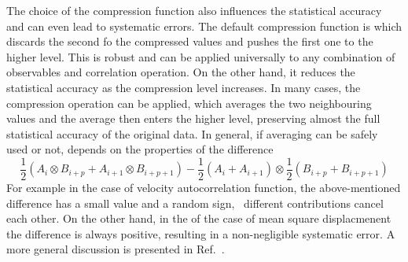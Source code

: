 The choice of the compression function also influences the statistical
accuracy and can even lead to systematic errors. The default compression 
function is  which discards the second fo the compressed 
values and pushes the first one to the higher level. This is robust and 
can be applied universally to any combination of observables and
correlation operation. On the other hand, it reduces the
statistical accuracy as the compression level increases.
In many cases, the  compression operation
can be applied, which averages the two neighbouring values
and the average then enters the higher level, preserving
almost the full statistical accuracy of the original data. 
In general, if averaging can be safely used or not, depends on the 
properties of the difference
\begin{equation} 
\frac{1}{2} (A_i \otimes B_{i+p} + A_{i+1} \otimes B_{i+p+1} ) - 
\frac{1}{2} (A_i + A_{i+1} ) \otimes \frac{1}{2} (B_{i+p} +  B_{i+p+1})
\label{eq:difference}
\end{equation} 
For example in the case of velocity autocorrelation function, the
above-mentioned difference has a small value and a random sign, \ie\ 
different contributions cancel each other. On the other hand, in the
of the case of mean square displacmenent the difference is always positive,
resulting in a non-negligible systematic error. A more general
discussion is presented in Ref.~\cite{ramirez10a}.
